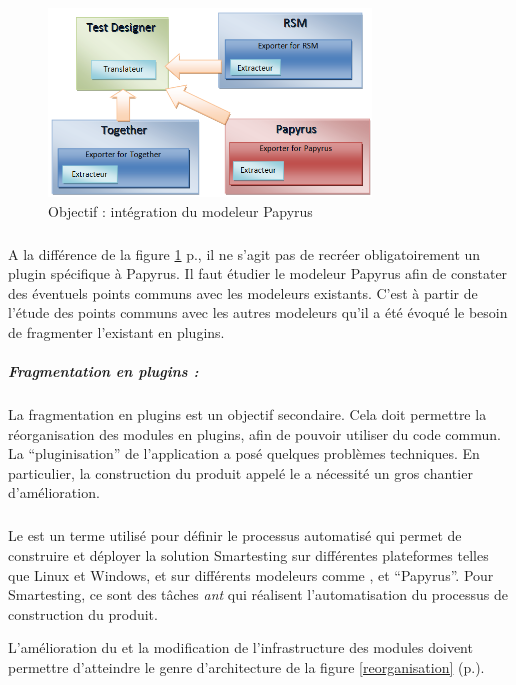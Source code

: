 \begin{figure}[!ht]
\begin{center}
  \includegraphics[height=5cm]{images/objectif_papyrus2.png}
  \caption{Objectif : intégration du modeleur Papyrus}
  \label{ObjectifPapyrus}
\end{center}
\end{figure}

\subparagraph*{}
A la différence de la figure \ref{ObjectifPapyrus} p.\pageref{ObjectifPapyrus}, il ne s'agit pas de recréer obligatoirement un plugin spécifique à Papyrus. 
Il faut étudier le modeleur Papyrus afin de constater des éventuels points communs avec les modeleurs existants.
C'est à partir de l'étude des points communs avec les autres modeleurs qu'il a été évoqué le besoin de fragmenter l'existant en plugins.

\subparagraph{Fragmentation en plugins :}
La fragmentation en plugins est un objectif secondaire. 
Cela doit permettre la réorganisation des modules en plugins, afin de pouvoir utiliser du code commun.
La ``pluginisation'' de l'application a posé quelques problèmes techniques.
En particulier, la construction du produit appelé le \build a nécessité un gros chantier d'amélioration.

\subparagraph*{}
Le \build est un terme utilisé pour définir le processus automatisé qui permet de construire et déployer la solution Smartesting sur différentes plateformes telles que Linux et Windows, et sur différents modeleurs comme \together, \rsm et ``Papyrus''.
Pour Smartesting, ce sont des tâches \textit{ant} qui réalisent l'automatisation du processus de construction du produit.

L'amélioration du \build et la modification de l'infrastructure des modules doivent permettre d'atteindre le genre d'architecture de la figure \ref{reorganisation} (p.\pageref{reorganisation}).

